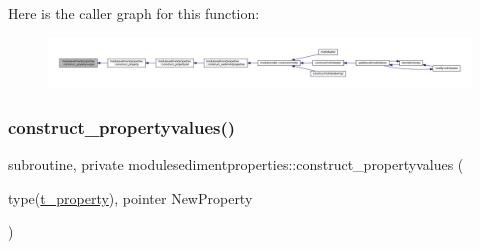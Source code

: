 Here is the caller graph for this function\+:\nopagebreak
\begin{figure}[H]
\begin{center}
\leavevmode
\includegraphics[width=350pt]{namespacemodulesedimentproperties_ae799f87453bb5cd4088f0289710bf961_icgraph}
\end{center}
\end{figure}
\mbox{\label{namespacemodulesedimentproperties_a63773e38287296de2a4e2baec3bfe034}} 
\subsubsection{\texorpdfstring{construct\+\_\+propertyvalues()}{construct\_propertyvalues()}}
{\footnotesize\ttfamily subroutine, private modulesedimentproperties\+::construct\+\_\+propertyvalues (\begin{DoxyParamCaption}\item[{type(\mbox{\hyperlink{structmodulesedimentproperties_1_1t__property}{t\+\_\+property}}), pointer}]{New\+Property }\end{DoxyParamCaption})\hspace{0.3cm}{\ttfamily [private]}}

